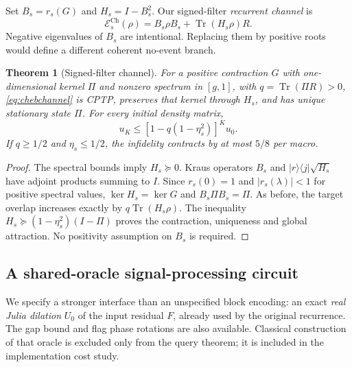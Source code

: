 \documentclass{ieeeaccess}
\newtheorem{theorem}{Theorem}\newtheorem{lemma}{Lemma}
\newcommand{\ket}[1]{\lvert #1\rangle}\newcommand{\bra}[1]{\langle #1\rvert}
\newcommand{\Tr}{\operatorname{Tr}}\newcommand{\E}{\mathcal E}
\begin{document}
Set $B_s=r_s(G)$ and $H_s=I-B_s^2$. Our signed-filter \emph{recurrent channel} is
\begin{equation}\label{eq:chebchannel}
\E_s^{\mathrm{Ch}}(\rho)=B_s\rho B_s+\Tr(H_s\rho)R.
\end{equation}
Negative eigenvalues of $B_s$ are intentional. Replacing them by positive roots would define a different coherent no-event branch.

\begin{theorem}[Signed-filter channel]\label{thm:cheb}
For a positive contraction $G$ with one-dimensional kernel $\Pi$ and nonzero spectrum in $[g,1]$, with $q=\Tr(\Pi R)>0$, \eqref{eq:chebchannel} is CPTP, preserves that kernel through $H_s$, and has unique stationary state $\Pi$. For every initial density matrix,
\begin{equation}\label{eq:chebrate}
u_K\le[1-q(1-\eta_s^2)]^K u_0.
\end{equation}
If $q\ge1/2$ and $\eta_s\le1/2$, the infidelity contracts by at most $5/8$ per macro.
\end{theorem}
\begin{proof}
The spectral bounds imply $H_s\succeq0$. Kraus operators $B_s$ and $\ket r\bra j\sqrt{H_s}$ have adjoint products summing to $I$. Since $r_s(0)=1$ and $|r_s(\lambda)|<1$ for positive spectral values, $\ker H_s=\ker G$ and $B_s\Pi B_s=\Pi$. As before, the target overlap increases exactly by $q\Tr(H_s\rho)$. The inequality $H_s\succeq(1-\eta_s^2)(I-\Pi)$ proves the contraction, uniqueness and global attraction. No positivity assumption on $B_s$ is required.
\end{proof}

\subsection{A shared-oracle signal-processing circuit}
We specify a stronger interface than an unspecified block encoding: an exact \emph{real Julia dilation} $U_0$ of the input residual $F$, already used by the original recurrence. The gap bound and flag phase rotations are also available. Classical construction of that oracle is excluded only from the query theorem; it is included in the implementation cost study.
\end{document}
